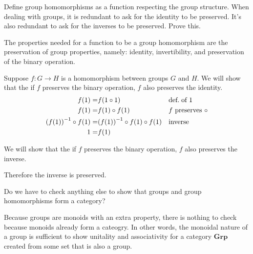 \begin{ttta}
	Define group homomorphisms as a function respecting the group structure. When
	dealing with groups, it is redundant to ask for the identity to be preserved.
	It’s also redundant to ask for the inverses to be preserved. Prove this.
\end{ttta}
\begin{proofitem}
	\item The properties needed for a function to be a group homomorphism are the
	preservation of group properties, namely: identity, invertibility, and
	preservation of the binary operation.
	\item Suppose $f: G \rightarrow H$ is a homomorphism between groups $G$ and $H$.
	We will show that the if $f$ preserves the binary operation, $f$ also
	preserves the identity.
	\begin{align*}
		f(1) =                    & f(1\circ 1)                         &  & \text{def.\;of }1        \\
		f(1)=                     & f(1)\circ f(1)                      &  & f\text{ preserves }\circ \\
		{(f(1))}^{-1} \circ f(1)= & {(f(1))}^{-1} \circ f(1) \circ f(1) &  & \text{inverse}           \\
		1=                        & f(1)
	\end{align*}
	\item We will show that the if $f$ preserves the binary operation, $f$ also
	preserves the inverse.
	\item Therefore the inverse is preserved.
\end{proofitem}

\begin{ttta}
	Do we have to check anything else to show that groups and group homomorphisms form a category?
\end{ttta}
Because groups are monoids with an extra property, there is nothing to check
because monoids already form a cateogry. In other words, the monoidal nature of
a group is sufficient to show unitality and associativity for a category
$\mathbf{Grp}$ created from some set that is also a group.

